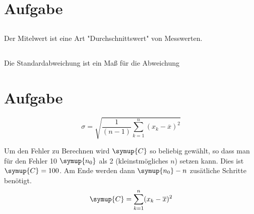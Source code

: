 

    \section{Aufgabe }
        \subsection{}
        Der Mitelwert ist eine Art "Durchschnittswert" von Messwerten.

        \subsection{}
        Die Standardabweichung ist ein Maß für die Abweichung

        \subsection{}


    \section{Aufgabe}
        \begin{equation}
            \sigma = \sqrt{ \frac{1}{(n-1)} \sum_{k=1}^n (x_k -\overline{x})^2 }
        \end{equation}
        
    Um den Fehler zu Berechnen wird $\symup{C}$ so beliebig gewählt, so dass man für den Fehler 10 $\symup{n_0}$ als 2 (kleinstmögliches $n$) setzen kann. 
    Dies ist $\symup{C}=100$. Am Ende werden dann $\symup{n_0}-n$ zusätliche Schritte benötigt.
        \begin{equation}
           \symup{C}=\sum_{k=1}^n (x_k -\overline{x})^2 \\
        \end{equation}

